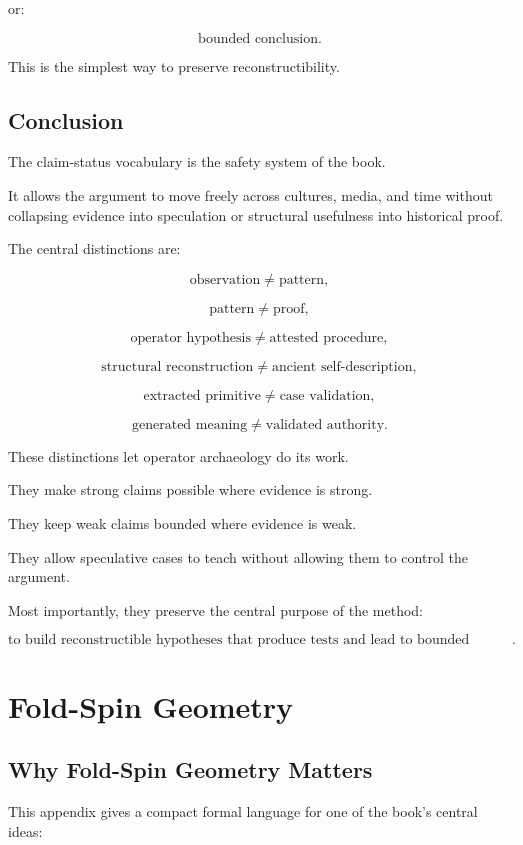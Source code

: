 \documentclass[11pt]{book}
\begin{document}
or:

\[
\text{bounded conclusion}.
\]

This is the simplest way to preserve reconstructibility.

\section{Conclusion}

The claim-status vocabulary is the safety system of the book.

It allows the argument to move freely across cultures, media, and time without collapsing evidence into speculation or structural usefulness into historical proof.

The central distinctions are:

\[
\text{observation} \neq \text{pattern},
\]

\[
\text{pattern} \neq \text{proof},
\]

\[
\text{operator hypothesis} \neq \text{attested procedure},
\]

\[
\text{structural reconstruction} \neq \text{ancient self-description},
\]

\[
\text{extracted primitive} \neq \text{case validation},
\]

\[
\text{generated meaning} \neq \text{validated authority}.
\]

These distinctions let operator archaeology do its work.

They make strong claims possible where evidence is strong.

They keep weak claims bounded where evidence is weak.

They allow speculative cases to teach without allowing them to control the argument.

Most importantly, they preserve the central purpose of the method:

\[
\text{to build reconstructible hypotheses that produce tests and lead to bounded confidence}.
\]

\chapter{Fold-Spin Geometry}

\section{Why Fold-Spin Geometry Matters}

This appendix gives a compact formal language for one of the book's central ideas:
\end{document}

